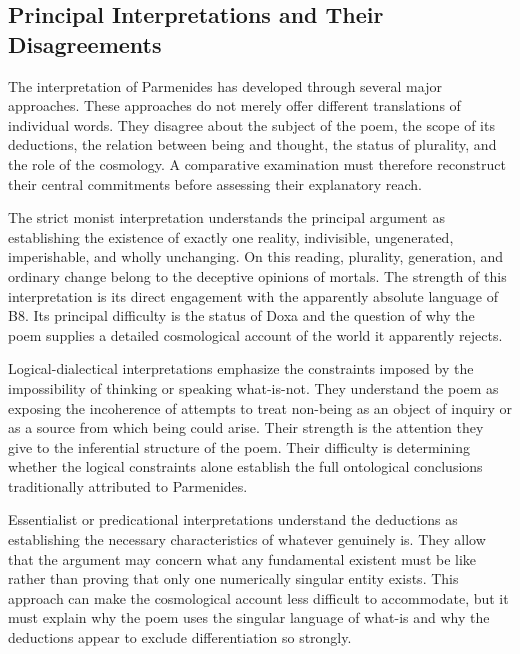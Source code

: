 \subsection{Principal Interpretations and Their Disagreements}


The interpretation of Parmenides has developed
through several major approaches. These
approaches do not merely offer different
translations of individual words. They
disagree about the subject of the poem,
the scope of its deductions, the relation
between being and thought, the status of
plurality, and the role of the cosmology.
A comparative examination must therefore
reconstruct their central commitments
before assessing their explanatory reach.


The strict monist interpretation understands
the principal argument as establishing the
existence of exactly one reality, indivisible,
ungenerated, imperishable, and wholly
unchanging. On this reading, plurality,
generation, and ordinary change belong
to the deceptive opinions of mortals.
The strength of this interpretation is
its direct engagement with the apparently
absolute language of B8. Its principal
difficulty is the status of Doxa and the
question of why the poem supplies a detailed
cosmological account of the world it
apparently rejects.


Logical-dialectical interpretations emphasize
the constraints imposed by the impossibility
of thinking or speaking what-is-not. They
understand the poem as exposing the
incoherence of attempts to treat non-being
as an object of inquiry or as a source
from which being could arise. Their strength
is the attention they give to the inferential
structure of the poem. Their difficulty
is determining whether the logical
constraints alone establish the full
ontological conclusions traditionally
attributed to Parmenides.


Essentialist or predicational interpretations
understand the deductions as establishing
the necessary characteristics of whatever
genuinely is. They allow that the argument
may concern what any fundamental existent
must be like rather than proving that
only one numerically singular entity exists.
This approach can make the cosmological
account less difficult to accommodate,
but it must explain why the poem uses
the singular language of what-is and
why the deductions appear to exclude
differentiation so strongly.

